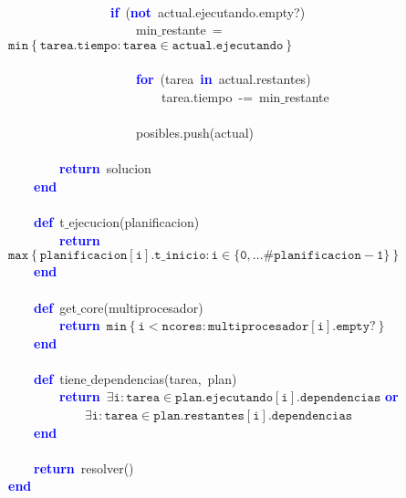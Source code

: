 \mbox{} \\
\mbox{}\ \ \ \ \ \ \ \ \ \ \ \ \ \ \ \ \textbf{\textcolor{Blue}{if}}\ \textcolor{BrickRed}{(}\textbf{\textcolor{Blue}{not}}\ actual\textcolor{BrickRed}{.}ejecutando\textcolor{BrickRed}{.}empty?\textcolor{BrickRed}{)} \\
\mbox{}\ \ \ \ \ \ \ \ \ \ \ \ \ \ \ \ \ \ \ \ min$\_$restante\ \textcolor{BrickRed}{=}\ $\mathtt{min\left\{tarea.tiempo: tarea \in actual.ejecutando\right\}}$ \\
\mbox{} \\
\mbox{}\ \ \ \ \ \ \ \ \ \ \ \ \ \ \ \ \ \ \ \ \textbf{\textcolor{Blue}{for}}\ \textcolor{BrickRed}{(}tarea\ \textbf{\textcolor{Blue}{in}}\ actual\textcolor{BrickRed}{.}restantes\textcolor{BrickRed}{)} \\
\mbox{}\ \ \ \ \ \ \ \ \ \ \ \ \ \ \ \ \ \ \ \ \ \ \ \ tarea\textcolor{BrickRed}{.}tiempo\ \textcolor{BrickRed}{-=}\ min$\_$restante \\
\mbox{} \\
\mbox{}\ \ \ \ \ \ \ \ \ \ \ \ \ \ \ \ \ \ \ \ posibles\textcolor{BrickRed}{.}push\textcolor{BrickRed}{(}actual\textcolor{BrickRed}{)} \\
\mbox{} \\
\mbox{}\ \ \ \ \ \ \ \ \textbf{\textcolor{Blue}{return}}\ solucion \\
\mbox{}\ \ \ \ \textbf{\textcolor{Blue}{end}} \\
\mbox{} \\
\mbox{}\ \ \ \ \textbf{\textcolor{Blue}{def}}\ t$\_$ejecucion\textcolor{BrickRed}{(}planificacion\textcolor{BrickRed}{)} \\
\mbox{}\ \ \ \ \ \ \ \ \textbf{\textcolor{Blue}{return}}\ $\mathtt{max\left\{ planificacion[i].t\_inicio : i \in \{0, \dots \#planificacion-1 \} \right\}}$ \\
\mbox{}\ \ \ \ \textbf{\textcolor{Blue}{end}} \\
\mbox{} \\
\mbox{}\ \ \ \ \textbf{\textcolor{Blue}{def}}\ get$\_$core\textcolor{BrickRed}{(}multiprocesador\textcolor{BrickRed}{)} \\
\mbox{}\ \ \ \ \ \ \ \ \textbf{\textcolor{Blue}{return}}\ $\mathtt{min\left\{i < ncores : multiprocesador[i].empty? \right\}}$ \\
\mbox{}\ \ \ \ \textbf{\textcolor{Blue}{end}} \\
\mbox{} \\
\mbox{}\ \ \ \ \textbf{\textcolor{Blue}{def}}\ tiene$\_$dependencias\textcolor{BrickRed}{(}tarea\textcolor{BrickRed}{,}\ plan\textcolor{BrickRed}{)} \\
\mbox{}\ \ \ \ \ \ \ \ \textbf{\textcolor{Blue}{return}}\ $\mathtt{\exists i : tarea \in plan.ejecutando[i].dependencias}$ \textbf{\textcolor{Blue}{or}} \\
\mbox{}\ \ \ \ \ \ \ \ \ \ \ \ $\mathtt{\exists i : tarea \in plan.restantes[i].dependencias}$ \\
\mbox{}\ \ \ \ \textbf{\textcolor{Blue}{end}} \\
\mbox{} \\
\mbox{}\ \ \ \ \textbf{\textcolor{Blue}{return}}\ resolver\textcolor{BrickRed}{()} \\
\mbox{}\textbf{\textcolor{Blue}{end}} \\
\mbox{}
